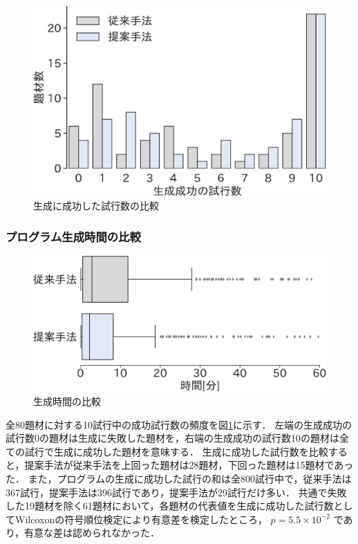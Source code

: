 \documentclass[uplatex,dvipdfmx,a4paper]{jsarticle}
\begin{document}
\begin{figure}[t]
  \centering
  \includegraphics[width=\linewidth]{fig/sucCntBar.pdf}
  \caption{生成に成功した試行数の比較}
  \label{fig:suc_count}
\end{figure}

\subsubsection{プログラム生成時間の比較}
\begin{figure}[t]
  \centering
  \includegraphics[width=\linewidth]{fig/allbox.pdf}
  \caption{生成時間の比較}
  \label{fig:time_all}
\end{figure}


全80題材に対する10試行中の成功試行数の頻度を図\ref{fig:suc_count}に示す．
左端の生成成功の試行数0の題材は生成に失敗した題材を，右端の生成成功の試行数10の題材は全ての試行で生成に成功した題材を意味する．
生成に成功した試行数を比較すると，提案手法が従来手法を上回った題材は28題材，下回った題材は15題材であった．
また，プログラムの生成に成功した試行の和は全800試行中で，従来手法は367試行，提案手法は396試行であり，提案手法が29試行だけ多い．
共通で失敗した19題材を除く61題材において，各題材の代表値を生成に成功した試行数としてWilcoxonの符号順位検定により有意差を検定したところ，
$p=5.5\times10^{-2}$ であり，有意な差は認められなかった．
\end{document}

